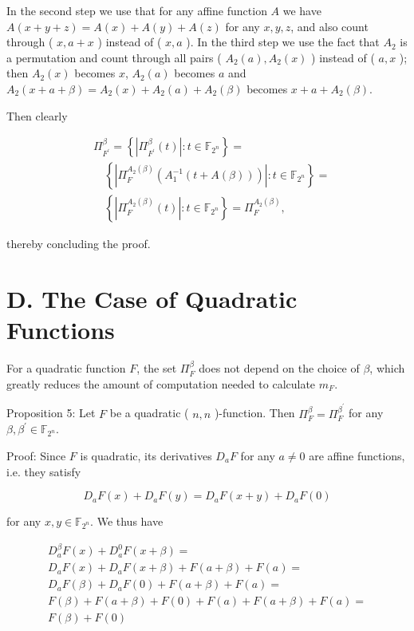 \documentclass[10pt]{article}
\begin{document}
In the second step we use that for any affine function $A$ we have $A(x+y+z)=A(x)+A(y)+A(z)$ for any $x, y, z$, and also count through ( $x, a+x$ ) instead of ( $x, a$ ). In the third step we use the fact that $A_{2}$ is a permutation and count through all pairs ( $A_{2}(a), A_{2}(x)$ ) instead of ( $a, x$ ); then $A_{2}(x)$ becomes $x$, $A_{2}(a)$ becomes $a$ and $A_{2}(x+a+\beta)=A_{2}(x)+A_{2}(a)+A_{2}(\beta)$ becomes $x+a+A_{2}(\beta)$.

Then clearly

$$
\begin{aligned}
& \Pi_{F^{\prime}}^{\beta}=\left\{\left|\Pi_{F^{\prime}}^{\beta}(t)\right|: t \in \mathbb{F}_{2^{n}}\right\}= \\
& \quad\left\{\left|\Pi_{F}^{A_{2}(\beta)}\left(A_{1}^{-1}(t+A(\beta))\right)\right|: t \in \mathbb{F}_{2^{n}}\right\}= \\
& \quad\left\{\left|\Pi_{F}^{A_{2}(\beta)}(t)\right|: t \in \mathbb{F}_{2^{n}}\right\}=\Pi_{F}^{A_{2}(\beta)},
\end{aligned}
$$

thereby concluding the proof.

\section*{D. The Case of Quadratic Functions}
For a quadratic function $F$, the set $\Pi_{F}^{\beta}$ does not depend on the choice of $\beta$, which greatly reduces the amount of computation needed to calculate $m_{F}$.

Proposition 5: Let $F$ be a quadratic ( $n, n$ )-function. Then $\Pi_{F}^{\beta}=\Pi_{F}^{\beta^{\prime}}$ for any $\beta, \beta^{\prime} \in \mathbb{F}_{2^{n}}$.

Proof: Since $F$ is quadratic, its derivatives $D_{a} F$ for any $a \neq 0$ are affine functions, i.e. they satisfy

$$
D_{a} F(x)+D_{a} F(y)=D_{a} F(x+y)+D_{a} F(0)
$$

for any $x, y \in \mathbb{F}_{2^{n}}$. We thus have

\[
\begin{array}{r}
D_{a}^{\beta} F(x)+D_{a}^{0} F(x+\beta)= \\
D_{a} F(x)+D_{a} F(x+\beta)+F(a+\beta)+F(a)= \\
D_{a} F(\beta)+D_{a} F(0)+F(a+\beta)+F(a)= \\
F(\beta)+F(a+\beta)+F(0)+F(a)+F(a+\beta)+F(a)= \\
F(\beta)+F(0) \tag{8}
\end{array}
\]
\end{document}
